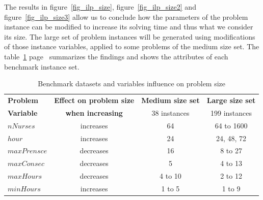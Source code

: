 The results in figure~\ref{fig_ilp_size}, figure~\ref{fig_ilp_size2} and figure~\ref{fig_ilp_size3} allow us to conclude how the parameters of the problem instance can be modified to increase its solving time and thus what we consider its size. The large set of problem instances will be generated using modifications of those instance variables, applied to some problems of the medium size set. The table~\ref{tab:ilp_size} page~\pageref{tab:ilp_size} summarizes the findings and shows the attributes of each benchmark instance set.

\begin{table}[ht] 
\centering 
\begin{tabularx}{0.75\textwidth}{|l|c|c|c|}
\hline
\textbf{Problem} & \textbf{Effect on problem size}  & \textbf{Medium size set} & \textbf{Large size set} \\

\textbf{Variable}  		& \textbf{when increasing}  & 38 instances &  199 instances \\
\hline
\textbf{$nNurses$} & increases      &  64	&  64 to 1600 \\
\textbf{$hour$}   & increases		& 24	&  24, 48, 72 \\
\textbf{$maxPrensce$} & decreases	& 16	& 8 to 27 \\
\textbf{$maxConsec$} & decreases		& 5	&  4 to 13		\\
\textbf{$maxHours$} & decreases		& 4 to 10	& 2 to 12 \\
\textbf{$minHours$} & increases		& 1 to 5	& 1 to 9\\
\hline
\end{tabularx}
\caption{Benchmark datasets and variables influence on problem size}
\label{tab:ilp_size}
\end{table}



